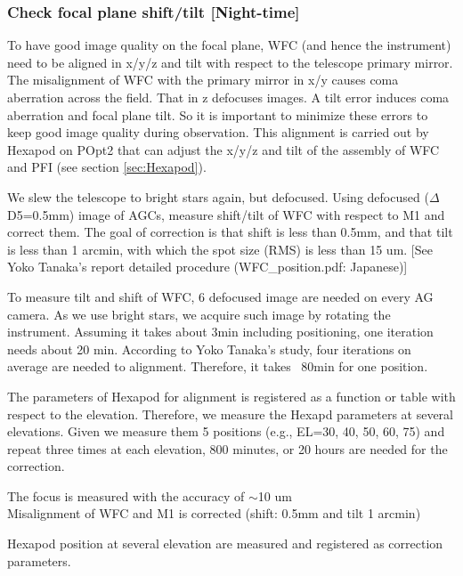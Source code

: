 \subsubsection{Check focal plane shift/tilt [Night-time]}\label{secflow:WFCTiltShift}

To have good image quality on the focal plane, WFC (and hence the instrument) need to be aligned in x/y/z and tilt with respect to the telescope primary mirror.
The misalignment of WFC with the primary mirror in x/y causes coma aberration across the field.
That in z defocuses images.
A tilt error induces coma aberration and focal plane tilt.
So it is important to minimize these errors to keep good image quality during observation. 
This alignment is carried out by Hexapod on POpt2 that can adjust the x/y/z and tilt of the assembly of WFC and PFI (see section \ref{sec:Hexapod}).


We slew the telescope to bright stars again, but defocused.
Using defocused ($\Delta$D5=0.5mm) image of AGCs, measure shift/tilt of WFC with respect to M1 and correct them.
The goal of correction is that shift is less than 0.5mm, and that tilt is less than 1 arcmin, with which the spot size (RMS) is less than 15 um.
[See Yoko Tanaka's report detailed procedure (WFC\_position.pdf: Japanese)]

To measure tilt and shift of WFC, 6 defocused image are needed on every AG camera.
As we use bright stars, we acquire such image by rotating the instrument.
Assuming it takes about 3min including positioning, one iteration needs about 20 min.
According to Yoko Tanaka's study, four iterations on average are needed to alignment.
Therefore, it takes ~80min for one position.

The parameters of Hexapod for alignment is registered as a function or table with respect to the elevation.
Therefore, we measure the Hexapd parameters at several elevations.
Given we measure them 5 positions (e.g., EL=30, 40, 50, 60, 75) and repeat three times at each elevation, 800 minutes, or 20 hours are needed for the correction.


\begin{itembox}[l]{}
The focus is measured with the accuracy of $\sim$10 um \\
Misalignment of  WFC and M1 is corrected (shift: 0.5mm and tilt 1 arcmin)

Hexapod position at several elevation are measured and registered as correction parameters.

\end{itembox}
